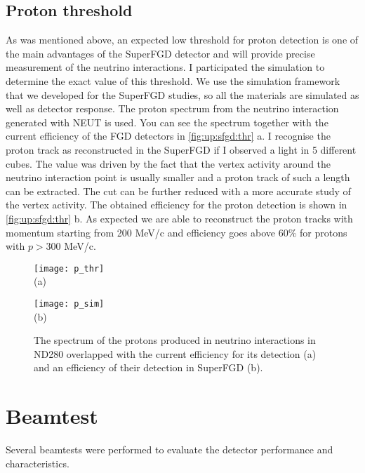 \documentclass[main.tex]{subfiles}
\begin{document}
\subsection{Proton threshold}
\label{sec:up:sfgd:thr}
As was mentioned above, an expected low threshold for proton detection is one of the main advantages of the SuperFGD detector and will provide precise measurement of the neutrino interactions. I participated the simulation to determine the exact value of this threshold. We use the simulation framework that we developed for the SuperFGD studies, so all the materials are simulated as well as detector response. The proton spectrum from the neutrino interaction generated with NEUT is used. You can see the spectrum together with the current efficiency of the FGD detectors in \autoref{fig:up:sfgd:thr} a. I recognise the proton track as reconstructed in the SuperFGD if I observed a light in 5 different cubes. The value was driven by the fact that the vertex activity around the neutrino interaction point is usually smaller and a proton track of such a length can be extracted. The cut can be further reduced with a more accurate study of the vertex activity. The obtained efficiency for the proton detection is shown in \autoref{fig:up:sfgd:thr} b. As expected we are able to reconstruct the proton tracks with momentum starting from 200 MeV/c and efficiency goes above 60\% for protons with $p>300$ MeV/c.

\begin{figure}[!ht]
	\centering
  \begin{minipage}{0.49\linewidth}
    \centering
    \texttt{[image: p\_thr]} \\ (a)
  \end{minipage}
  \begin{minipage}{0.49\linewidth}
    \centering
    \texttt{[image: p\_sim]} \\ (b)
  \end{minipage}
  \caption{The spectrum of the protons produced in neutrino interactions in ND280 overlapped with the current efficiency for its detection (a)  and an efficiency of their detection in  SuperFGD (b).}
  \label{fig:up:sfgd:thr}
\end{figure}

\section{Beamtest}
\label{sec:up:sfgd:beam}
Several beamtests were performed to evaluate the detector performance and characteristics.
\end{document}

